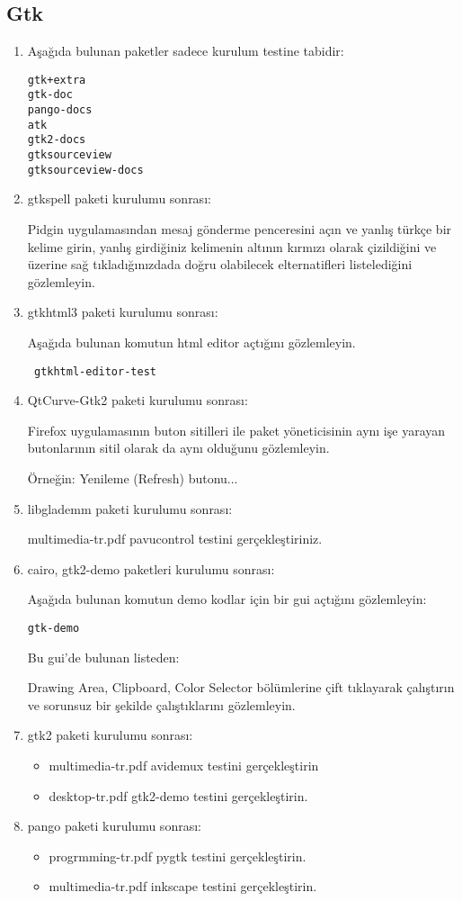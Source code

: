 \documentclass[a4paper,10pt]{article}
\begin{document}
\subsection*{Gtk}
\begin{enumerate}
\item Aşağıda bulunan paketler sadece kurulum testine tabidir:
\begin{verbatim}
gtk+extra
gtk-doc
pango-docs
atk
gtk2-docs
gtksourceview
gtksourceview-docs
\end{verbatim}

\item gtkspell paketi kurulumu sonrası:

  Pidgin uygulamasından mesaj gönderme penceresini açın ve yanlış türkçe bir kelime girin, yanlış girdiğiniz kelimenin altının kırmızı olarak çizildiğini ve üzerine sağ tıkladığınızdada doğru olabilecek elternatifleri listelediğini gözlemleyin.

\item gtkhtml3 paketi kurulumu sonrası:

Aşağıda bulunan komutun html editor açtığını gözlemleyin.
\begin{verbatim}
 gtkhtml-editor-test
\end{verbatim}

\item QtCurve-Gtk2 paketi kurulumu sonrası:

Firefox uygulamasının buton sitilleri ile paket yöneticisinin aynı işe yarayan butonlarının sitil olarak da aynı olduğunu gözlemleyin.

Örneğin: Yenileme (Refresh) butonu...
\item libglademm paketi kurulumu sonrası:

multimedia-tr.pdf pavucontrol testini gerçekleştiriniz.
 
 \item cairo,  gtk2-demo paketleri kurulumu sonrası: 

Aşağıda bulunan komutun demo kodlar için bir gui açtığını gözlemleyin:
\begin{verbatim}
gtk-demo
\end{verbatim}

Bu gui'de bulunan listeden:

Drawing Area, Clipboard, Color Selector bölümlerine çift tıklayarak çalıştırın ve sorunsuz bir şekilde çalıştıklarını gözlemleyin.

\item gtk2 paketi kurulumu sonrası: 
\begin{itemize}
 \item multimedia-tr.pdf avidemux testini gerçekleştirin
\item desktop-tr.pdf gtk2-demo testini gerçekleştirin.
\end{itemize}

\item pango paketi kurulumu sonrası: 
\begin{itemize}
 \item progrmming-tr.pdf pygtk testini gerçekleştirin.
 \item multimedia-tr.pdf inkscape testini gerçekleştirin.
\end{itemize}
\end{enumerate}
\end{document}
